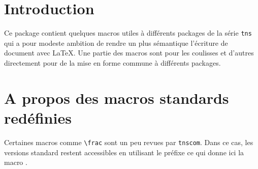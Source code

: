 \documentclass[12pt,a4paper]{article}
\begin{document}
\section{Introduction}

Ce package contient quelques macros utiles à différents packages de la série \verb+tns+ qui a pour modeste ambition de rendre un plus sémantique l'écriture de document avec \LaTeX.
Une partie des macros sont pour les coulisses et d'autres directement pour de la mise en forme commune à différents packages.




\section{A propos des macros standards redéfinies}

Certaines macros comme \verb+\frac+ sont un peu revues par \verb+tnscom+.
Dans ce cas, les versions standard restent accessibles en utilisant le préfixe  ce qui donne ici la macro .
\end{document}

